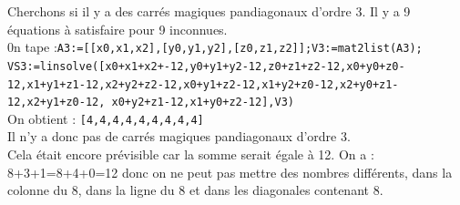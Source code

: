 \documentclass[a4paper,11pt]{book}
\begin{document}
Cherchons si il y a des carr\'es magiques pandiagonaux d'ordre 3.
Il y a 9 \'equations \`a satisfaire pour 9 inconnues.\\
0n tape :{\tt A3:=[[x0,x1,x2],[y0,y1,y2],[z0,z1,z2]];V3:=mat2list(A3);}\\
{\tt VS3:=linsolve([x0+x1+x2+-12,y0+y1+y2-12,z0+z1+z2-12,x0+y0+z0-12,x1+y1+z1-12,x2+y2+z2-12,x0+y1+z2-12,x1+y2+z0-12,x2+y0+z1-12,x2+y1+z0-12,
x0+y2+z1-12,x1+y0+z2-12],V3)}\\
On obtient : {\tt [4,4,4,4,4,4,4,4,4]}\\
Il n'y a donc pas de carr\'es magiques pandiagonaux d'ordre $3$.\\
Cela \'etait encore pr\'evisible car la somme serait \'egale \`a 12. On a :\\
8+3+1=8+4+0=12 donc on ne peut pas mettre des nombres diff\'erents, dans la 
colonne du 8, dans la ligne du 8 et dans les diagonales contenant 8.\\
\end{document}
